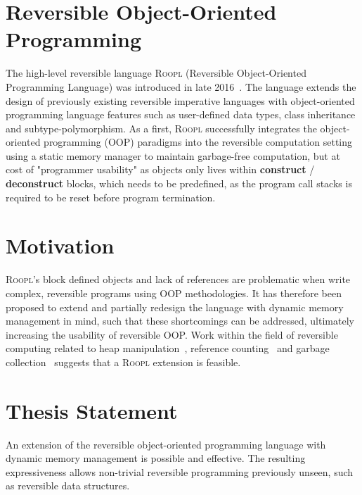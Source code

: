 \section{Reversible Object-Oriented Programming}
\label{sec:reversible-object-oriented-programming}
The high-level reversible language \textsc{Roopl} (Reversible Object-Oriented Programming Language) was introduced in late 2016~\cite{th:roopl, th:roopl2}. The language extends the design of previously existing reversible imperative languages with object-oriented programming language features such as user-defined data types, class inheritance and subtype-polymorphism. As a first, \textsc{Roopl} successfully integrates the object-oriented programming (OOP) paradigms into the reversible computation setting using a static memory manager to maintain garbage-free computation, but at cost of "programmer usability" as objects only lives within \textbf{construct} / \textbf{deconstruct} blocks, which needs to be predefined, as the program call stacks is required to be reset before program termination.
 

\section{Motivation}
\label{sec:motivation}
\textsc{Roopl}'s block defined objects and lack of references are problematic when write complex, reversible programs using OOP methodologies. It has therefore been proposed to extend and partially redesign the language with dynamic memory management in mind, such that these shortcomings can be addressed, ultimately increasing the usability of reversible OOP. Work within the field of reversible computing related to heap manipulation~\cite{ha:heap}, reference counting~\cite{tm:refcounting} and garbage collection~\cite{tm:garbage} suggests that a \textsc{Roopl} extension is feasible.


\section{Thesis Statement}
\label{sec:thesis-statement}
An extension of the reversible object-oriented programming language with dynamic memory management is possible and effective. The resulting expressiveness allows non-trivial reversible programming previously unseen, such as reversible data structures.

